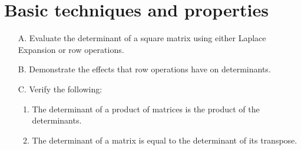 \section{Basic techniques and properties}

\begin{outcome}

\begin{enumerate}
\item[A.] Evaluate the determinant of a square matrix using either Laplace Expansion or row operations.

\item[B.] Demonstrate the effects that row operations have on determinants.

\item[C.] Verify the following:

\begin{enumerate}
\item The determinant of a product of matrices is the product of the
determinants.

\item The determinant of a matrix is equal to the determinant of its
transpose.
\end{enumerate}


\end{enumerate}
\end{outcome}